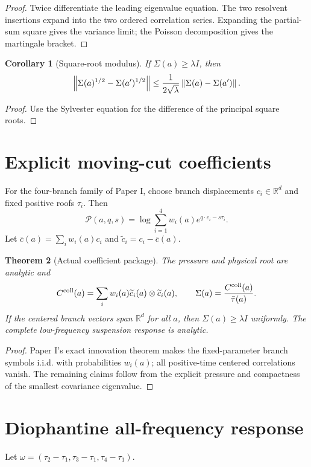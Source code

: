 \documentclass[11pt,reqno]{amsart}
\newtheorem{theorem}{Theorem}[section]
\newtheorem{corollary}[theorem]{Corollary}
\theoremstyle{definition}
\theoremstyle{remark}
\newcommand{\R}{\mathbb R}
\newcommand{\norm}[1]{\left\lVert #1\right\rVert}
\begin{document}
\begin{proof}
Twice differentiate the leading eigenvalue equation.  The two resolvent
insertions expand into the two ordered correlation series.  Expanding the
partial-sum square gives the variance limit; the Poisson decomposition gives
the martingale bracket.
\end{proof}

\begin{corollary}[Square-root modulus]
If $\Sigma(a)\ge\lambda I$, then
\[
 \norm{\Sigma(a)^{1/2}-\Sigma(a')^{1/2}}
 \le{1\over2\sqrt\lambda}\norm{\Sigma(a)-\Sigma(a')}.
\]
\end{corollary}

\begin{proof}
Use the Sylvester equation for the difference of the principal square roots.
\end{proof}

\section{Explicit moving-cut coefficients}\label{sec:explicit}
For the four-branch family of Paper I, choose branch displacements
$c_i\in\R^d$ and fixed positive roofs $\tau_i$.  Then
\[
 \mathscr P(a,q,s)=
 \log\sum_{i=1}^4w_i(a)e^{q\cdot c_i-s\tau_i}.
\]
Let $\bar c(a)=\sum_iw_i(a)c_i$ and
$\widetilde c_i=c_i-\bar c(a)$.

\begin{theorem}[Actual coefficient package]\label{thm:actual}
The pressure and physical root are analytic and
\[
 C^{\rm coll}(a)=
 \sum_iw_i(a)\widetilde c_i(a)\otimes\widetilde c_i(a),
 \qquad
 \Sigma(a)={C^{\rm coll}(a)\over\bar\tau(a)}.
\]
If the centered branch vectors span $\R^d$ for all $a$, then
$\Sigma(a)\ge\lambda I$ uniformly.  The complete low-frequency suspension
response is analytic.
\end{theorem}

\begin{proof}
Paper I's exact innovation theorem makes the fixed-parameter branch symbols
i.i.d. with probabilities $w_i(a)$; all positive-time centered correlations
vanish.  The remaining claims follow from the explicit pressure and compactness
of the smallest covariance eigenvalue.
\end{proof}

\section{Diophantine all-frequency response}\label{sec:HF}
Let
$\omega=(\tau_2-\tau_1,\tau_3-\tau_1,\tau_4-\tau_1)$.
\end{document}
